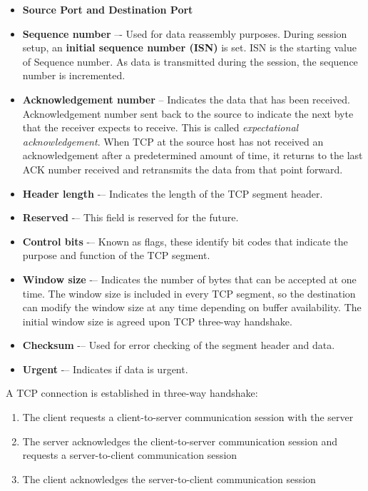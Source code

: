 \begin{itemize}
\item \textbf{Source Port and Destination Port}

\item \textbf{Sequence number} –- Used for data reassembly purposes. During session setup, an \textbf{initial sequence number (ISN)} is set. ISN is the starting value of Sequence number. As data is transmitted during the session, the sequence number is incremented. 

\item \textbf{Acknowledgement number} – Indicates the data that has been received. Acknowledgement number sent back to the source to indicate the next byte that the receiver expects to receive. This is called \emph{expectational acknowledgement}. When TCP at the source host has not received an acknowledgement after a predetermined amount of time, it returns to the last ACK number received and retransmits the data from that point forward. 

\item \textbf{Header length} -– Indicates the length of the TCP segment header.
\item \textbf{Reserved} -– This field is reserved for the future.
\item \textbf{Control bits} -– Known as flags, these identify bit codes that indicate the purpose and function of the TCP segment.
\item \textbf{Window size} -– Indicates the number of bytes that can be accepted at one time. The window size is included in every TCP segment, so the destination can modify the window size at any time depending on buffer availability. The initial window size is agreed upon  TCP three-way handshake. 
\item \textbf{Checksum} -– Used for error checking of the segment header and data.
\item \textbf{Urgent} -– Indicates if data is urgent.
\end{itemize}

A TCP connection is established in three-way handshake:

\begin{enumerate}
\item The client requests a client-to-server communication session with the server
\item The server acknowledges the client-to-server communication session and requests a server-to-client communication session
\item The client acknowledges the server-to-client communication session 
\end{enumerate}

